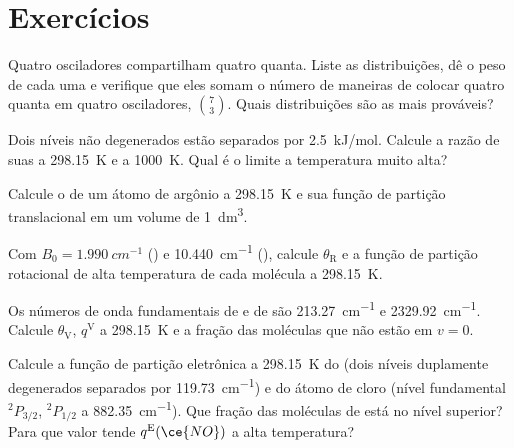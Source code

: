 \section{Exercícios}

\begin{exercise}[$\star$]\label{exo:b3:partition-functions:1}
Quatro osciladores compartilham quatro quanta. Liste as distribuições, dê o peso
de cada uma e verifique que eles somam o número de maneiras de colocar quatro
quanta  em quatro osciladores, $\binom{7}{3}$. Quais distribuições
são as mais prováveis?
\end{exercise}

\begin{exercise}[$\star$]\label{exo:b3:partition-functions:2}
Dois níveis não degenerados estão separados por \qty{2.5}{kJ/mol}. Calcule a razão
de suas  a \qty{298.15}{K} e a \qty{1000}{K}. Qual é o limite a
temperatura muito alta?
\end{exercise}

\begin{exercise}[$\star$]\label{exo:b3:partition-functions:3}
Calcule o  de um átomo de argônio a \qty{298.15}{K} e
sua função de partição translacional em um volume de \qty{1}{dm^3}.
\end{exercise}

\begin{exercise}[$\star$]\label{exo:b3:partition-functions:4}
Com $B_0 = \qty{1.990}{cm^{-1}}$ () e \qty{10.440}{cm^{-1}} (), calcule $\theta_{\mathrm R}$ e a
função de partição rotacional de alta temperatura de cada molécula a
\qty{298.15}{K}.
\end{exercise}

\begin{exercise}[$\star\star$]\label{exo:b3:partition-functions:5}
Os números de onda fundamentais de  e de  são \qty{213.27}{cm^{-1}} e
\qty{2329.92}{cm^{-1}}. Calcule $\theta_{\mathrm V}$, $q^{\mathrm V}$ a \qty{298.15}{K} e a fração das moléculas
que não estão em $v = 0$.
\end{exercise}

\begin{exercise}[$\star\star$]\label{exo:b3:partition-functions:6}
Calcule a função de partição eletrônica a \qty{298.15}{K} do  (dois níveis
duplamente degenerados separados por \qty{119.73}{cm^{-1}}) e do átomo de cloro (nível
fundamental ${}^2P_{3/2}$, ${}^2P_{1/2}$ a \qty{882.35}{cm^{-1}}). Que fração das moléculas de 
está no nível superior? Para que valor tende $q^{\mathrm E}(\ce{NO})$ a alta temperatura?
\end{exercise}

